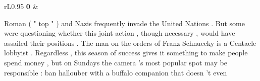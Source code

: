 {\begin{tabular}{rL{0.95\linewidth}}
\textbf{0} &\strut{}Roman ( " top " ) and Nazis frequently invade the United Nations . But some were questioning whether this joint action , though necessary , would have assailed their positions . The man on the orders of Franz Schnuecky is a Centacle lobbyist . Regardless , this season of success gives it something to make people spend money , but on Sundays the camera 's most popular spot may be responsible : ban hallouber with a buffalo companion that doesn 't even\\
\end{tabular}
}
